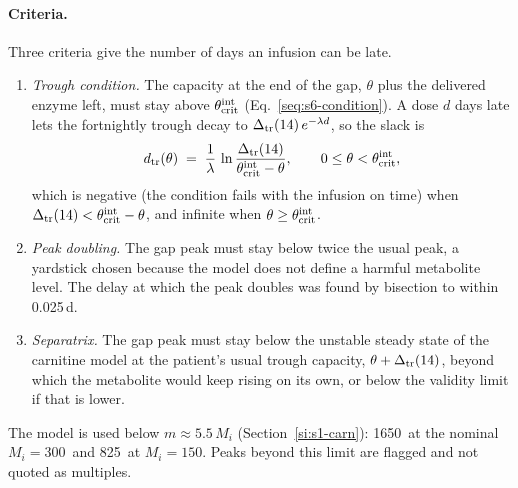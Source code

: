 \paragraph{Criteria.} Three criteria give the number of days an infusion can be late.
\begin{enumerate}[nosep,leftmargin=1.6em]
\item \emph{Trough condition.} The capacity at the end of the gap, $\theta$ plus the delivered
enzyme left, must stay above $\theta_{\mathrm{crit}}^{\mathrm{int}}$ (Eq.~\eqref{seq:s6-condition}). A dose $d$ days late lets the
fortnightly trough decay to $\Delta_{\mathrm{tr}}(14)\,e^{-\lambda d}$, so the slack is
\begin{equation}
\label{seq:s7-dq}
d_{\mathrm{tr}}(\theta)\;=\;\frac{1}{\lambda}\,\ln\frac{\Delta_{\mathrm{tr}}(14)}{\theta_{\mathrm{crit}}^{\mathrm{int}}-\theta},\qquad 0\le\theta<\theta_{\mathrm{crit}}^{\mathrm{int}} ,
\end{equation}
which is negative (the condition fails with the infusion on time) when $\Delta_{\mathrm{tr}}(14)<\theta_{\mathrm{crit}}^{\mathrm{int}}-\theta$,
and infinite when $\theta\ge\theta_{\mathrm{crit}}^{\mathrm{int}}$.
\item \emph{Peak doubling.} The gap peak must stay below twice the usual peak, a yardstick chosen
because the model does not define a harmful metabolite level. The delay at which the peak doubles
was found by bisection to within 0.025\,d.
\item \emph{Separatrix.} The gap peak must stay below the unstable steady state of the carnitine
model at the patient's usual trough capacity, $\theta+\Delta_{\mathrm{tr}}(14)$, beyond which the metabolite would
keep rising on its own, or below the validity limit if that is lower.
\end{enumerate}
The model is used below $m\approx5.5\,M_i$ (Section~\ref{si:s1-carn}): 1650\uM\ at the nominal
$M_i=300$\uM\ and 825\uM\ at $M_i=150$\uM. Peaks beyond this limit are flagged and not quoted as
multiples.

